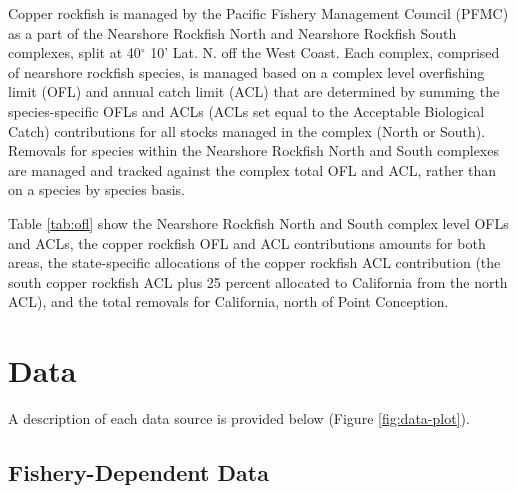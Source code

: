 \documentclass[11pt,
  english,
  a4paper,
]{article}
\begin{document}
\leavevmode\tagmcend\tagstructend


Copper rockfish is managed by the Pacific Fishery Management Council (PFMC) as a part of the Nearshore Rockfish North and Nearshore Rockfish South complexes, split at 40{\(^\circ\)\leavevmode\tagmcend\tagstructend} 10' Lat. N. off the West Coast. Each complex, comprised of nearshore rockfish species, is managed based on a complex level overfishing limit (OFL) and annual catch limit (ACL) that are determined by summing the species-specific OFLs and ACLs (ACLs set equal to the Acceptable Biological Catch) contributions for all stocks managed in the complex (North or South). Removals for species within the Nearshore Rockfish North and South complexes are managed and tracked against the complex total OFL and ACL, rather than on a species by species basis.

\leavevmode\tagmcend\tagstructend\par


Table \ref{tab:ofl} show the Nearshore Rockfish North and South complex level OFLs and ACLs, the copper rockfish OFL and ACL contributions amounts for both areas, the state-specific allocations of the copper rockfish ACL contribution (the south copper rockfish ACL plus 25 percent allocated to California from the north ACL), and the total removals for California, north of Point Conception.

\leavevmode\tagmcend\tagstructend\par


\hypertarget{data}{%
\section{Data}\label{data}}

\leavevmode\tagmcend\tagstructend


A description of each data source is provided below (Figure \ref{fig:data-plot}).

\leavevmode\tagmcend\tagstructend\par


\hypertarget{fishery-dependent-data}{%
\subsection{Fishery-Dependent Data}\label{fishery-dependent-data}}
\end{document}
